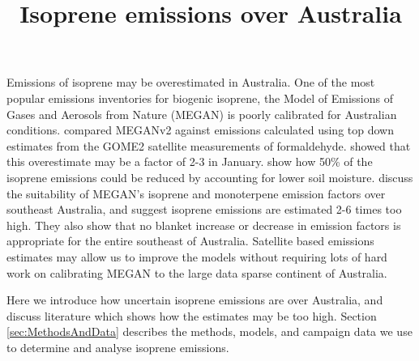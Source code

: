 \documentclass[acp, manuscript]{copernicus} %
\begin{document}
\title{Isoprene emissions over Australia}




\maketitle

\begin{abstract}
  
\end{abstract}

\introduction  %

  Emissions of isoprene may be overestimated in Australia.
  One of the most popular emissions inventories for biogenic isoprene, the Model of Emissions of Gases and Aerosols from Nature (MEGAN) is poorly calibrated for Australian conditions.
  \cite{Muller2008} compared MEGANv2 against emissions calculated using top down estimates from the GOME2 satellite measurements of formaldehyde.
  \cite{Stavrakou2015} showed that this overestimate may be a factor of 2-3 in January.
  \cite{Sindelarova2014} show how 50\% of the isoprene emissions could be reduced by accounting for lower soil moisture.
  \cite{Emmerson2016} discuss the suitability of MEGAN's isoprene and monoterpene emission factors over southeast Australia, and suggest isoprene emissions are estimated 2-6 times too high.
  They also show that no blanket increase or decrease in emission factors is appropriate for the entire southeast of Australia.
  Satellite based emissions estimates may allow us to improve the models without requiring lots of hard work on calibrating MEGAN to the large data sparse continent of Australia.

  Here we introduce how uncertain isoprene emissions are over Australia, and discuss literature which shows how the estimates may be too high.
  Section \ref{sec:MethodsAndData} describes the methods, models, and campaign data we use to determine and analyse isoprene emissions.
  
\end{document}
